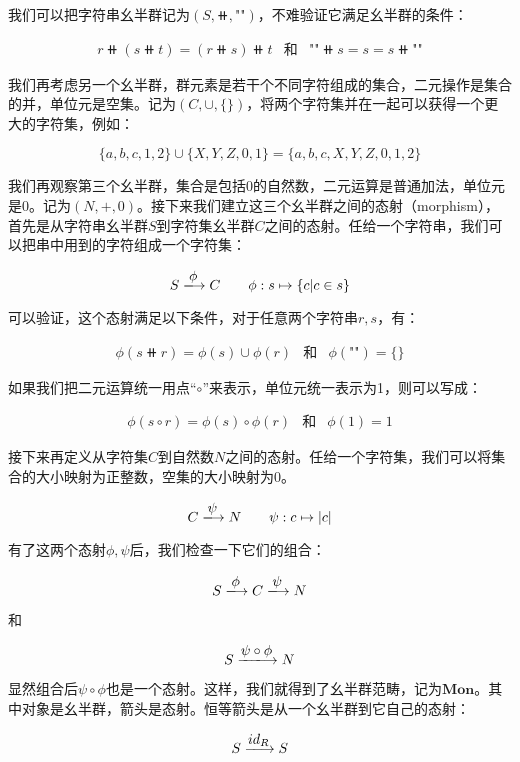 \documentclass{article}
\begin{document}
我们可以把字符串幺半群记为$(S, \doubleplus, \texttt{""})$，不难验证它满足幺半群的条件：

\[
\begin{array}{rcl}
r \doubleplus (s \doubleplus t) = (r \doubleplus s) \doubleplus t &
\text{和} &
\texttt{""} \doubleplus s = s = s \doubleplus \texttt{""}
\end{array}
\]

我们再考虑另一个幺半群，群元素是若干个不同字符组成的集合，二元操作是集合的并，单位元是空集。记为$(C, \cup, \{\})$，将两个字符集并在一起可以获得一个更大的字符集，例如：

\[
\{a, b, c, 1, 2\} \cup \{X, Y, Z, 0, 1\} = \{a, b, c, X, Y, Z, 0, 1, 2\}
\]

我们再观察第三个幺半群，集合是包括0的自然数，二元运算是普通加法，单位元是0。记为$(N, +, 0)$。接下来我们建立这三个幺半群之间的态射（morphism），首先是从字符串幺半群$S$到字符集幺半群$C$之间的态射。任给一个字符串，我们可以把串中用到的字符组成一个字符集：

\[
S \arrowto{\phi} C \quad \quad \phi: s \mapsto \{c | c \in s\}
\]

可以验证，这个态射满足以下条件，对于任意两个字符串$r, s$，有：

\[
\begin{array}{rcl}
\phi(s \doubleplus r) = \phi(s) \cup \phi(r) & \text{和} & \phi(\texttt{""}) = \{\}
\end{array}
\]

如果我们把二元运算统一用点“$\circ$”来表示，单位元统一表示为1，则可以写成：

\[
\begin{array}{rcl}
\phi(s \circ r) = \phi(s) \circ \phi(r) & \text{和} & \phi(1) = 1
\end{array}
\]

接下来再定义从字符集$C$到自然数$N$之间的态射。任给一个字符集，我们可以将集合的大小映射为正整数，空集的大小映射为0。

\[
C \arrowto{\psi} N \quad \quad \psi: c \mapsto |c|
\]

有了这两个态射$\phi, \psi$后，我们检查一下它们的组合：

\[
S \arrowto{\phi} C \arrowto{\psi} N
\]

和

\[
S \arrowto{\psi \circ \phi} N
\]

显然组合后$\psi \circ \phi$也是一个态射。这样，我们就得到了幺半群范畴，记为$\pmb{Mon}$。其中对象是幺半群，箭头是态射。恒等箭头是从一个幺半群到它自己的态射：

\[
S \arrowto{id_R} S
\]
\end{document}
